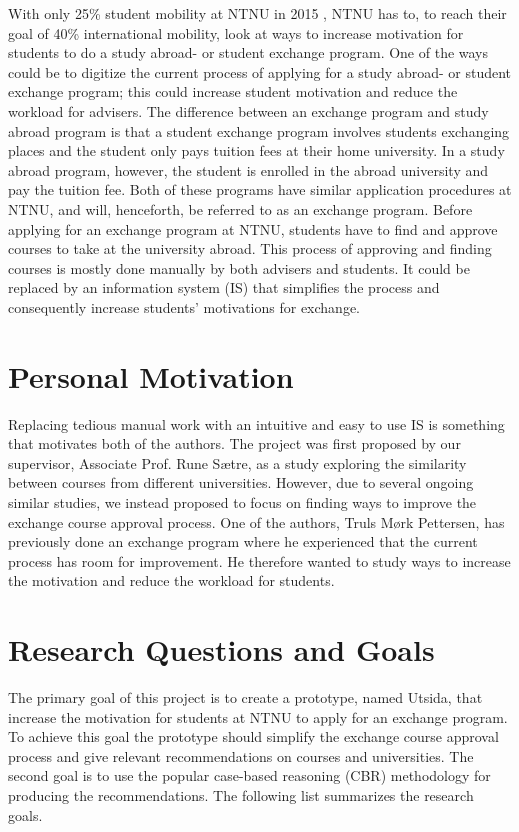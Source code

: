 With only 25\% student mobility at NTNU in 2015 \cite{studentutveksling_andel}, NTNU has to, to reach their goal of 40\% international mobility, look at ways to increase motivation for students to do a study abroad- or student exchange program. One of the ways could be to digitize the current process of applying for a study abroad- or student exchange program; this could increase student motivation and reduce the workload for advisers. The difference between an exchange program and study abroad program is that a student exchange program involves students exchanging places and the student only pays tuition fees at their home university. In a study abroad program, however, the student is enrolled in the abroad university and pay the tuition fee. Both of these programs have similar application procedures at NTNU, and will, henceforth, be referred to as an exchange program. Before applying for an exchange program at NTNU, students have to find and approve courses to take at the university abroad. This process of approving and finding courses is mostly done manually by both advisers and students. It could be replaced by an information system (IS) that simplifies the process and consequently increase students' motivations for exchange. 

\section{Personal Motivation}
Replacing tedious manual work with an intuitive and easy to use IS is something that motivates both of the authors. The project was first proposed by our supervisor, Associate Prof. Rune Sætre, as a study exploring the similarity between courses from different universities. However, due to several ongoing similar studies, we instead proposed to focus on finding ways to improve the exchange course approval process. One of the authors, Truls Mørk Pettersen, has previously done an exchange program where he experienced that the current process has room for improvement. He therefore wanted to study ways to increase the motivation and reduce the workload for students.

\section{Research Questions and Goals}\label{RQ}
The primary goal of this project is to create a prototype, named Utsida, that increase the motivation for students at NTNU to apply for an exchange program. To achieve this goal the prototype should simplify the exchange course approval process and give relevant recommendations on courses and universities. The second goal is to use the popular case-based reasoning (CBR) methodology for producing the recommendations. The following list summarizes the research goals.


